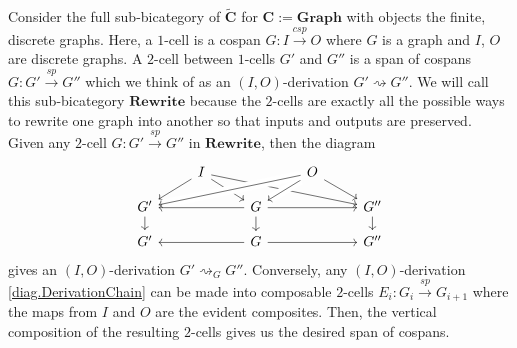 \documentclass[11pt]{amsart}
\newcommand{\cat}[1]{\mathbf{#1}}
\newcommand{\from}{\colon}
\renewcommand{\span}{\xrightarrow{\mathit{sp}}}
\newcommand{\cospan}{\xrightarrow{\mathit{csp}}}
\newcommand{\csC}{\widetilde{\mathbf{C}}}
\theoremstyle{remark}
\theoremstyle{definition}
\begin{document}
Consider the full sub-bicategory of $\csC$ for $\cat{C} := \cat{Graph}$ with objects the finite, discrete graphs. Here, a $1$-cell is a cospan $G \from I \cospan O$ where $G$ is a graph and $I$, $O$ are discrete graphs.  A $2$-cell between $1$-cells $G'$ and $G''$ is a span of cospans $G \from G' \span G''$ which we think of as an $(I,O)$-derivation $G' \rightsquigarrow G''$.  We will call this sub-bicategory $\cat{Rewrite}$ because the $2$-cells are exactly all the possible ways to rewrite one graph into another so that inputs and outputs are preserved. Given any $2$-cell $G \from G' \span G''$ in $\cat{Rewrite}$, then the diagram 
\[
\begin{tikzcd}[row sep=1em]
	{} &
	{I}
		\ar[dl]
		\ar[dr]
		\ar[drrr] &
	{} &
	{O} 
		\ar[dr]
		\ar[dl,crossing over]
		\ar[dlll,crossing over] &
	{} \\
	{G'} 
		\ar[d]  &
	{} &
	{G} 
		\ar[ll] 
		\ar[d]
		\ar[rr] &
	{} &
	{G''} 
		\ar[d] \\
	{G'} &
	{} &
	{G} 
		\ar[rr]
		\ar[ll] &
	{} &
	{G''}
\end{tikzcd}
\] 
gives an $(I,O)$-derivation $G' \rightsquigarrow_G G''$. Conversely, any $(I,O)$-derivation \eqref{diag.DerivationChain} can be made into composable $2$-cells $E_i \from G_i \span G_{i+1}$ where the maps from $I$ and $O$ are the evident composites. Then, the vertical composition of the resulting $2$-cells gives us the desired span of cospans.
\end{document}
